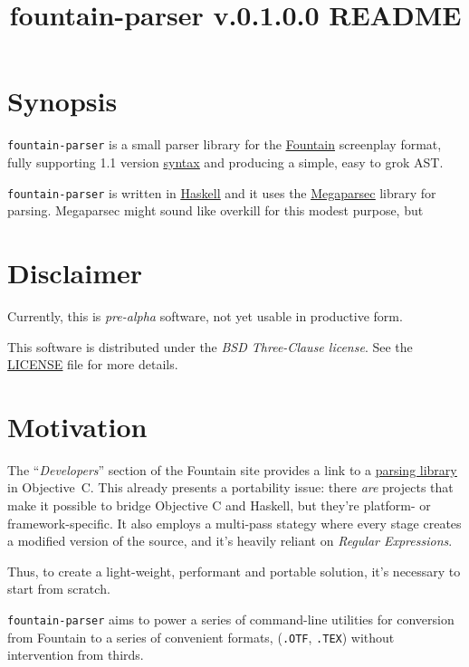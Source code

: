 \documentclass[11pt]{article}
\newcommand{\link}[2]{\underline{\color{darkblue}\href{#1}{#2}}}
\begin{document}
\title{\textbf{fountain-parser v.0.1.0.0 README}}
\author{}
\date{}
\maketitle

\section*{Synopsis}
\texttt{fountain-parser} is a small parser library for the
\link{https://fountain.io/}{\textrm{Fountain}} screenplay format,
fully supporting 1.1 version
\link{https://fountain.io/syntax/}{syntax} and
producing a simple, easy to grok \textrm{AST}.

\texttt{fountain-parser} is written in
\link{https://haskell.org}{\textrm{Haskell}} and it uses the
\link{https://hackage.haskell.org/package/megaparsec}{\textrm{Megaparsec}}
library for parsing. Megaparsec might sound like overkill for this
modest purpose, but 

\section*{Disclaimer}
Currently, this is \emph{pre-alpha} software, not yet usable in
productive form.

This software is distributed under the
\emph{\textrm{BSD Three-Clause license}}.
See the \link{run:./LICENSE}{LICENSE} file for more details.

\section*{Motivation}
The ``\emph{Developers}'' section of the Fountain site provides a
link to a
\link{https://github.com/nyousefi/Fountain}{parsing library}
in \textrm{Objective~C}. This already presents a portability
issue: there \emph{are} projects that make it possible to bridge
Objective C and Haskell, but they're platform- or
framework-specific.  It also employs a multi-pass stategy where
every stage creates a modified version of the source, and it's
heavily reliant on \emph{Regular Expressions}.

Thus, to create a light-weight, performant and portable
solution, it's necessary to start from scratch.

\texttt{fountain-parser} aims to power a series of command-line
utilities for conversion from Fountain to a series of convenient
formats, (\texttt{.OTF}, \texttt{.TEX}) without intervention
from thirds.
\end{document}
